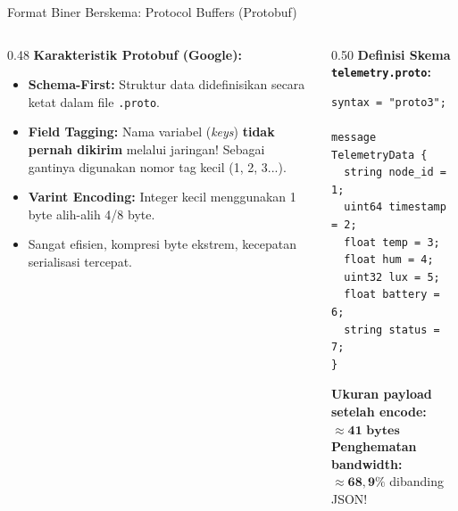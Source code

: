 \documentclass[aspectratio=169,10pt]{beamer}
\begin{document}
\begin{frame}[fragile]{Format Biner Berskema: Protocol Buffers (Protobuf)}
    \begin{columns}[T]
        \begin{column}{0.48\textwidth}
            \textbf{Karakteristik Protobuf (Google):}
            \begin{itemize}
                \item \textbf{Schema-First:} Struktur data didefinisikan secara ketat dalam file \texttt{.proto}.
                \item \textbf{Field Tagging:} Nama variabel (\textit{keys}) \textbf{tidak pernah dikirim} melalui jaringan! Sebagai gantinya digunakan nomor tag kecil (1, 2, 3...).
                \item \textbf{Varint Encoding:} Integer kecil menggunakan 1 byte alih-alih 4/8 byte.
                \item Sangat efisien, kompresi byte ekstrem, kecepatan serialisasi tercepat.
            \end{itemize}
        \end{column}
        \begin{column}{0.50\textwidth}
            \textbf{Definisi Skema \texttt{telemetry.proto}:}
            \begin{lstlisting}[style=slidecode]
syntax = "proto3";

message TelemetryData {
  string node_id = 1;
  uint64 timestamp = 2;
  float temp = 3;
  float hum = 4;
  uint32 lux = 5;
  float battery = 6;
  string status = 7;
}
            \end{lstlisting}
            \vspace{2pt}
            \textbf{Ukuran payload setelah encode:} $\approx \mathbf{41\text{ bytes}}$\\
            \textbf{Penghematan bandwidth:} $\approx \mathbf{68{,}9\%}$ dibanding JSON!
        \end{column}
    \end{columns}
\end{frame}
\end{document}

